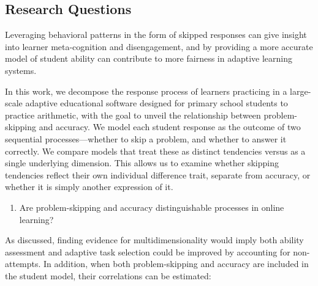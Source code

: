 \documentclass[11pt]{article}
\begin{document}
\subsection{Research Questions}
Leveraging behavioral patterns in the form of skipped responses can give insight into learner meta-cognition and disengagement, and by providing a more accurate model of student ability can contribute to more fairness in adaptive learning systems. 

In this work, we decompose the response process of learners practicing in a large-scale adaptive educational software designed for primary school students to practice arithmetic, with the goal to unveil the relationship between problem-skipping and accuracy. We model each student response as the outcome of two sequential processes---whether to skip a problem, and whether to answer it correctly. We compare models that treat these as distinct tendencies versus as a single underlying dimension. This allows us to examine whether skipping tendencies reflect their own individual difference trait, separate from accuracy, or whether it is simply another expression of it. 

\begin{enumerate}
    \item[\textbf{1.}] Are problem-skipping and accuracy distinguishable processes in online learning?  
\end{enumerate}

As discussed, finding evidence for multidimensionality would imply both ability assessment and adaptive task selection could be improved by accounting for non-attempts. In addition, when both problem-skipping and accuracy are included in the student model, their correlations can be estimated: 
\end{document}
